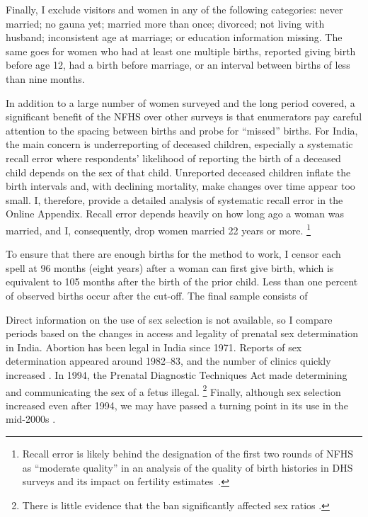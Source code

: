 \documentclass[12pt,letterpaper]{article}
\begin{document}
Finally, I exclude visitors and women in any of the following categories: never married; 
no gauna yet; married more than once; divorced; not living with husband; inconsistent age 
at marriage; or education information missing.  
The same goes for women who had at least one multiple births, reported giving birth 
before age 12, had a birth before marriage, or an interval between births of less than 
nine months. 

In addition to a large number of women surveyed and the long period covered, a significant 
benefit of the NFHS over other surveys is that enumerators pay careful attention to the 
spacing between births and probe for ``missed'' births.
For India, the main concern is underreporting of deceased children, especially a systematic 
recall error where respondents' likelihood of reporting the birth of a deceased child depends 
on the sex of that child.
Unreported deceased children inflate the birth intervals and, with declining mortality, 
make changes over time appear too small.
I, therefore, provide a detailed analysis of systematic recall error in the Online Appendix.
Recall error depends heavily on how long ago a woman was married, and I, consequently, 
drop women married 22 years or more.%
\footnote{
Recall error is likely behind the designation of the first two rounds of NFHS as ``moderate 
quality'' in an analysis of the quality of birth histories in DHS surveys and its impact 
on fertility estimates \citep{Schoumaker2014}.
}

To ensure that there are enough births for the method to work, I censor each spell at 96 
months (eight years) after a woman can first give birth, which is equivalent to 105 months 
after the birth of the prior child.
Less than one percent of observed births occur after the cut-off.
The final sample consists of 


% 

Direct information on the use of sex selection is not available, so I compare periods 
based on the changes in access and legality of prenatal sex determination in India.
Abortion has been legal in India since 1971.
Reports of sex determination appeared around 1982--83, and the number of clinics 
quickly increased \citep{Sudha1999,bhat06,Grover2006}.
In 1994, the Prenatal Diagnostic Techniques Act made determining and communicating 
the sex of a fetus illegal.%
\footnote{
There is little evidence that the ban significantly affected sex ratios \citep{Das-Gupta2016}.
}
Finally, although sex selection increased even after 1994, we may have passed a 
turning point in its use in the mid-2000s \citep{Das_Gupta2009,Kumar2012,Bongaarts2013,Diamond-Smith2015}.
\end{document}
